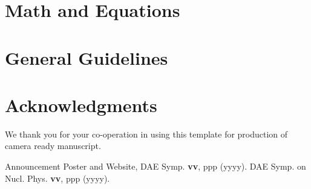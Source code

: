 \documentclass[twocolumn,amsmath,amssymb]{snp}
\begin{document}
\section{Math and Equations}

\section{General Guidelines}



\section*{Acknowledgments}
 We thank you for your co-operation in using this template  for production of camera ready manuscript.

\begin{thebibliography}{50}
 Announcement Poster and Website, DAE Symp. {\bf vv}, ppp (yyyy).
 DAE Symp. on Nucl. Phys. {\bf vv}, ppp (yyyy).
\end{thebibliography}
\end{document}
